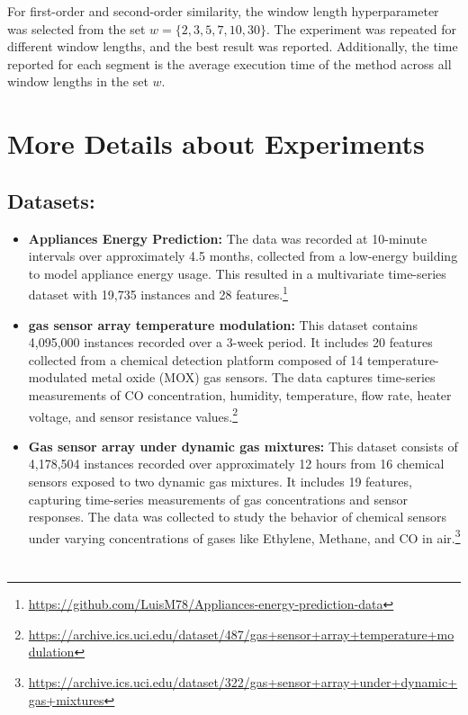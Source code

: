 \documentclass[twoside,11pt]{article}
\begin{document}
For first-order and second-order similarity, the window length hyperparameter was selected from the set \( w = \{2, 3, 5, 7, 10, 30\} \). The experiment was repeated for different window lengths, and the best result was reported. Additionally, the time reported for each segment is the average execution time of the method across all window lengths in the set \( w \).

\newpage

\appendix

\section{More Details about Experiments}
\subsection{Datasets:}
\begin{itemize}
  \item \textbf{Appliances Energy Prediction:} The data was recorded at 10-minute intervals over approximately 4.5 months, collected from a low-energy building to model appliance energy usage. This resulted in a multivariate time-series dataset with 19,735 instances and 28 features.\footnote{\url{https://github.com/LuisM78/Appliances-energy-prediction-data}}
\end{itemize}
\begin{itemize}
  \item \textbf{gas sensor array temperature modulation:} This dataset contains 4,095,000 instances recorded over a 3-week period. It includes 20 features collected from a chemical detection platform composed of 14 temperature-modulated metal oxide (MOX) gas sensors. The data captures time-series measurements of CO concentration, humidity, temperature, flow rate, heater voltage, and sensor resistance values.\footnote{\url{https://archive.ics.uci.edu/dataset/487/gas+sensor+array+temperature+modulation}}

\end{itemize}
\begin{itemize}
  \item \textbf{Gas sensor array under dynamic gas mixtures:} This dataset consists of 4,178,504 instances recorded over approximately 12 hours from 16 chemical sensors exposed to two dynamic gas mixtures. It includes 19 features, capturing time-series measurements of gas concentrations and sensor responses. The data was collected to study the behavior of chemical sensors under varying concentrations of gases like Ethylene, Methane, and CO in air.\footnote{\url{https://archive.ics.uci.edu/dataset/322/gas+sensor+array+under+dynamic+gas+mixtures}}

\end{itemize}







\section{}

\noindent



\vskip 0.2in

\end{document}
